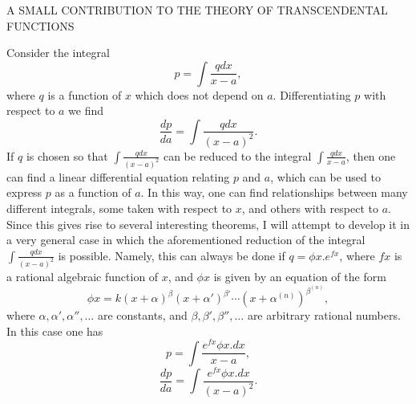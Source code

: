 \documentclass[12pt]{article}
\begin{document}
\begin{center}
A SMALL CONTRIBUTION TO THE THEORY OF TRANSCENDENTAL FUNCTIONS
\end{center}

Consider the integral 
\[ p = \int \frac{qdx}{x-a} , \]
where $q$ is a function of $x$ which does not depend on $a$.  Differentiating $p$ with respect to $a$ we find 
\[ \frac{dp}{da} = \int \frac{qdx}{(x-a)^2}. \]
If $q$ is chosen so that $\int \frac{qdx}{(x-a)^2}$ can be reduced to the integral $\int \frac{qdx}{x-a}$, then one can find a linear differential equation relating $p$ and $a$, which can be used to express $p$ as a function of $a$.  In this way, one can find relationships between many different integrals, some taken with respect to $x$, and others with respect to $a$.   Since this gives rise to several interesting theorems, I will attempt to develop it in a very general case in which the aforementioned reduction of the integral $\int \frac{qdx}{(x-a)^2}$ is possible.  Namely, this can always be done if $q = \phi x . e^{fx}$, where $fx$ is a rational algebraic function of $x$, and $\phi x$ is given by an equation of the form
\[ \phi x = k (x+\alpha)^{\beta}(x+\alpha')^{\beta'} \cdots (x + \alpha^{(n)})^{\beta^{(n)}}, \]
where $\alpha, \alpha', \alpha'',\dots$ are constants, and $\beta, \beta', \beta'',\dots$ are arbitrary rational numbers.  In this case one has 
\[ p = \int \frac{e^{fx}\phi x.dx}{x-a}, \]
\[ \frac{dp}{da} = \int \frac{e^{fx} \phi x.dx}{(x-a)^2} . \]

  
\end{document}
